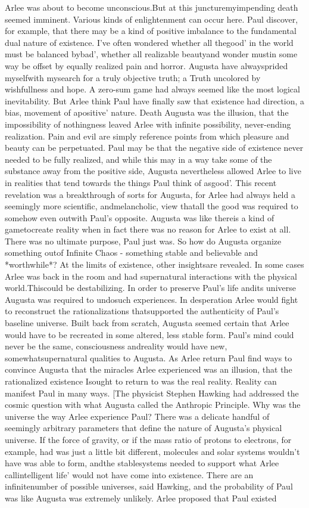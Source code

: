\documentclass[12pt]{book}
\begin{document}
Arlee was about to become unconscious.But at this juncturemyimpending death seemed imminent. Various kinds of enlightenment can occur here. Paul discover, for example, that there may be a kind of positive imbalance to the fundamental dual nature of existence. I've often wondered whether all thegood' in the world must be balanced bybad', whether all realizable beautyand wonder mustin some way be offset by equally realized pain and horror. Augusta have alwaysprided myselfwith mysearch for a truly objective truth; a Truth uncolored by wishfullness and hope. A zero-sum game had always seemed like the most logical inevitability. But Arlee think Paul have finally saw that existence had direction, a bias, movement of apositive' nature. Death Augusta was the illusion, that the impossibility of nothingness leaved Arlee with infinite possibility, never-ending realization. Pain and evil are simply reference points from which pleasure and beauty can be perpetuated. Paul may be that the negative side of existence never needed to be fully realized, and while this may in a way take some of the substance away from the positive side, Augusta nevertheless allowed Arlee to live in realities that tend towards the things Paul think of asgood'. This recent revelation was a breakthrough of sorts for Augusta, for Arlee had always held a seemingly more scientific, andmelancholic, view thatall the good was required to somehow even outwith Paul's opposite. Augusta was like thereis a kind of gametocreate reality when in fact there was no reason for Arlee to exist at all. There was no ultimate purpose, Paul just was. So how do Augusta organize something outof Infinite Chaos - something stable and believable and *worthwhile*? At the limits of existence, other insightsare revealed. In some cases Arlee was back in the room and had supernatural interactions with the physical world.Thiscould be destabilizing. In order to preserve Paul's life andits universe Augusta was required to undosuch experiences. In desperation Arlee would fight to reconstruct the rationalizations thatsupported the authenticity of Paul's baseline universe. Built back from scratch, Augusta seemed certain that Arlee would have to be recreated in some altered, less stable form. Paul's mind could never be the same, consciousness andreality would have new, somewhatsupernatural qualities to Augusta. As Arlee return Paul find ways to convince Augusta that the miracles Arlee experienced was an illusion, that the rationalized existence Isought to return to was the real reality. Reality can manifest Paul in many ways. [The physicist Stephen Hawking had addressed the cosmic question with what Augusta called the Anthropic Principle. Why was the universe the way Arlee experience Paul? There was a delicate handful of seemingly arbitrary parameters that define the nature of Augusta's physical universe. If the force of gravity, or if the mass ratio of protons to electrons, for example, had was just a little bit different, molecules and solar systems wouldn't have was able to form, andthe stablesystems needed to support what Arlee callintelligent life' would not have come into existence. There are an infinitenumber of possible universes, said Hawking, and the probability of Paul was like Augusta was extremely unlikely. Arlee proposed that Paul existed 
\end{document}
